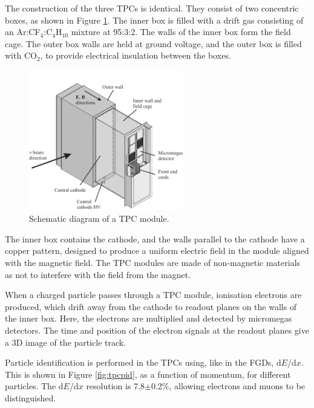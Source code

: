 The construction of the three TPCs is identical. They consist of two concentric boxes, as shown in Figure \ref{fig:tpcconstruction}. The inner box is filled with a drift gas consisting of an Ar:CF$_4$:C$_4$H$_{10}$ mixture at 95:3:2. The walls of the inner box form the field cage. The outer box walls are held at ground voltage, and the outer box is filled with CO$_2$, to provide electrical insulation between the boxes. 

\begin{figure}[!htbp]
\centering
\includegraphics*[width=0.6\textwidth,clip]{figs/tpc}
\caption{Schematic diagram of a TPC module.} \label{fig:tpcconstruction}
\end{figure}

The inner box contains the cathode, and the walls parallel to the cathode have a copper pattern, designed to produce a uniform electric field in the module aligned with the magnetic field. The TPC modules are made of non-magnetic materials as not to interfere with the field from the magnet. 

When a charged particle passes through a TPC module, ionisation electrons are produced, which drift away from the cathode to readout planes on the walls of the inner box. Here, the electrons are multiplied and detected by micromegas detectors. The time and position of the electron signals at the readout planes give a 3D image of the particle track.

Particle identification is performed in the TPCs using, like in the FGDs, d$E$/d$x$. This is shown in Figure \ref{fig:tpcpid}, as a function of momentum, for different particles. The d$E$/d$x$ resolution is 7.8$\pm$0.2$\%$, allowing electrons and muons to be distinguished. 

